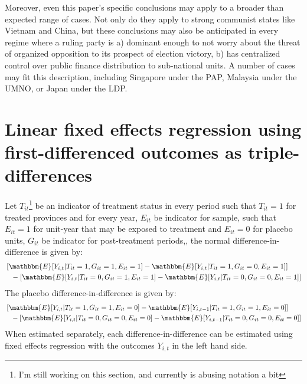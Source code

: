 \documentclass[12pt]{article}
\newcommand{\1}{\mathbbm{1}}
\renewcommand\r{\right}
\renewcommand\l{\left}
\newcommand\E{\mathbbm{E}}
\begin{document}
Moreover, even this paper's specific conclusions may apply to a broader than expected range of cases. Not only do they apply to strong communist states like Vietnam and China, but these conclusions may also be anticipated in every regime where a ruling party is a) dominant enough to not worry about the threat of organized opposition to its prospect of election victory, b) has centralized control over public finance distribution to sub-national units. A number of cases may fit this description, including Singapore under the PAP, Malaysia under the UMNO, or Japan under the LDP.



\newpage
\appendix


\newpage
\section{Linear fixed effects regression using first-differenced outcomes as triple-differences}
\label{app:proof1}

Let $T_{it}$\footnote{I'm still working on this section, and currently is abusing notation a bit} be an indicator of treatment status in every period such that $T_{it} = 1$ for treated provinces and for every year, $E_{it}$ be indicator for sample, such that $E_{it} = 1 $ for unit-year that may be exposed to treatment and $E_{it} = 0$ for placebo units, $G_{it}$ be indicator for post-treatment periods,, the normal difference-in-difference is given by:
	\begin{align*}
		& \l[\E[Y_{i,t} | T_{it}=1, G_{it}=1, E_{it}=1] - \E[Y_{i,t} | T_{it}=1, G_{it}=0, E_{it}=1]\r] \\
		&\phantom{=} - \l[\E[Y_{i,t} | T_{it}=0, G_{it}=1, E_{it}=1] - \E[Y_{i,t} | T_{it}=0, G_{it}=0, E_{it}=1]\r]
	\end{align*}
The placebo difference-in-difference is given by:
	\begin{align*}
		&\l[\E[Y_{i,t} | T_{it}=1, G_{it}=1, E_{it}=0] - \E[Y_{i,t-1} | T_{it}=1, G_{it}=1, E_{it}=0]\r] \\
		&\phantom{=} - \l[\E[Y_{i,t} | T_{it}=0, G_{it}=0, E_{it}=0] - \E[Y_{i,t-1} | T_{it}=0, G_{it}=0, E_{it}=0]\r]
	\end{align*}
When estimated separately, each difference-in-difference can be estimated using fixed effects regression with the outcomes $Y_{i,t}$ in the left hand side.
\end{document}
